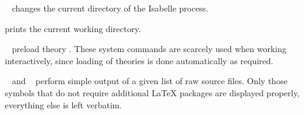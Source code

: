 \begin{isabellebody}
\begin{isamarkuptext}
  \begin{descr}

  \item [\mbox{\isa{\isacommand{cd}}}~\isa{path}] changes the current directory
  of the Isabelle process.

  \item [\mbox{\isa{\isacommand{pwd}}}] prints the current working directory.

  \item [\mbox{\isa{\isacommand{use{\isacharunderscore}thy}}}~\isa{A}] preload theory .
  These system commands are scarcely used when working interactively,
  since loading of theories is done automatically as required.

  \item [\mbox{\isa{\isacommand{display{\isacharunderscore}drafts}}}~\isa{paths} and \mbox{\isa{\isacommand{print{\isacharunderscore}drafts}}}~\isa{paths}] perform simple output of a given list
  of raw source files.  Only those symbols that do not require
  additional {\LaTeX} packages are displayed properly, everything else
  is left verbatim.

  \end{descr}%
\end{isamarkuptext}%
\isamarkuptrue%
%
\isadelimtheory
%
\endisadelimtheory
%
\isatagtheory
{}\isamarkupfalse%
%
\endisatagtheory
{\isafoldtheory}%
%
\isadelimtheory
%
\endisadelimtheory
\isanewline
\end{isabellebody}%
